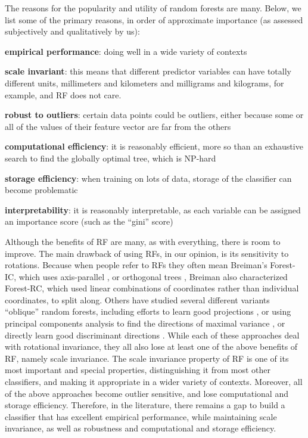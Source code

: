 \documentclass{article} %
\begin{document}
The reasons for the popularity and utility of random forests are many. Below, we list some of the primary reasons, in order of approximate importance (as assessed subjectively and qualitatively by us):
\begin{compactitem}
\item \textbf{empirical performance}: doing well in a wide variety of contexts
\item \textbf{scale invariant}: this means that different predictor variables can have totally different units, millimeters and kilometers and milligrams and kilograms, for example, and RF does not care.
\item \textbf{robust to outliers}: certain data points could be outliers, either because some or all of the values of their feature vector are far from the others
\item \textbf{computational efficiency}: it is reasonably efficient, more so than an exhaustive search to find the globally optimal tree, which is NP-hard \cite{Heath1993}
\item \textbf{storage efficiency}: when training on lots of data, storage of the classifier can become problematic
\item \textbf{interpretability}: it is reasonably interpretable, as each variable can be assigned an importance score (such as the ``gini'' score)
\end{compactitem}


Although the benefits of RF are many, as with everything, there is room to improve. The main drawback of using RFs, in our opinion, is its sensitivity to rotations.  Because when people refer to RFs they often mean Breiman's Forest-IC, which uses axis-parallel \cite{Heath1993}, or orthogonal trees \cite{Menze2011}, Breiman also characterized Forest-RC, which used linear combinations of coordinates rather than individual coordinates, to split along.  Others have studied several different variants ``oblique'' random forests, including efforts to learn good projections \cite{Heath1993,Tan2004}, or using principal components analysis to find the directions of maximal variance \cite{Ho1998,Rodriguez2006}, or directly learn good discriminant directions \cite{Menze2011}.  While each of these approaches deal with rotational invariance, they all also lose at least one of the above benefits of RF, namely scale invariance.  The scale invariance property of RF is one of its most important and special properties, distinguishing it from most other classifiers, and making it appropriate in a wider variety of contexts.  
Moreover, all of the above approaches become outlier sensitive, and lose computational and storage efficiency.
Therefore, in the literature, there remains a gap to build a classifier that has excellent empirical performance, while maintaining scale invariance, as well as robustness and computational and storage efficiency.
\end{document}
